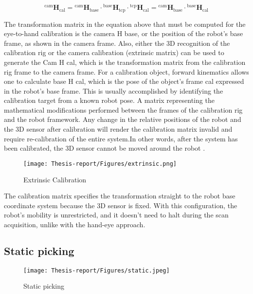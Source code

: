 \documentclass[12pt]{article}
\begin{document}
 \[
{}^{\text{cam}}\mathbf{H}_{\text{cal}} = {}^{\text{cam}}\mathbf{H}_{\text{base}} \cdot {}^{\text{base}}\mathbf{H}_{\text{tcp}} \cdot {}^{\text{tcp}}\mathbf{H}_{\text{cal}} = {}^{\text{cam}}\mathbf{H}_{\text{base}} \cdot {}^{\text{base}}\mathbf{H}_{\text{cal}} \tag{3}
\]


The transformation matrix in the equation above that must be computed for the eye-to-hand calibration is the camera H base, or the position of the robot's base frame, as shown in the camera frame. Also, either the 3D recognition of the calibration rig or the camera calibration (extrinsic matrix) can be used to generate the Cam H cal, which is the transformation matrix from the calibration rig frame to the camera frame.   For a calibration object, forward kinematics allows one to calculate base H cal, which is the pose of the object's frame cal expressed in the robot's base frame. This is usually accomplished by identifying the calibration target from a known robot pose. A matrix representing the mathematical modifications performed between the frames of the calibration rig and the robot framework.  Any change in the relative positions of the robot and the 3D sensor after calibration will render the calibration matrix invalid and require re-calibration of the entire system.In other words, after the system has been calibrated, the 3D sensor cannot be moved around the robot \cite{ref3}.\\


\begin{figure}[h]
    \centering
    \texttt{[image: Thesis-report/Figures/extrinsic.png]}
    \caption{Extrinsic Calibration \cite{ref2} } 
    \label{fig:Photoneo Cmaera}
\end{figure}

The calibration matrix specifies the transformation straight to the robot base coordinate system because the 3D sensor is fixed. With this configuration, the robot's mobility is unrestricted, and it doesn't need to halt during the scan acquisition, unlike with the hand-eye approach\cite{ref2}.
\subsection{Static picking}
\begin{figure}[h]
    \centering
    \texttt{[image: Thesis-report/Figures/static.jpeg]}
    \caption{Static picking}
    \label{fig:Photoneo Cmaera}
\end{figure}
\end{document}
